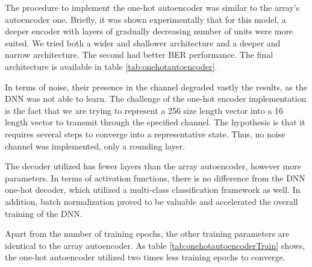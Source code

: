 \documentclass[conference]{IEEEtran}
\begin{document}
The procedure to implement the one-hot autoencoder was similar to the array's autoencoder one. Briefly, it was shown experimentally that for this model, a deeper encoder with layers of gradually decreasing number of units were more suited. We tried both a wider and shallower architecture and a deeper and narrow architecture. The second had better BER performance. The final architecture is available in table \ref{tab:onehotautoencoder}.

In terms of noise, their presence in the channel degraded vastly the results, as the DNN was not able to learn. The challenge of the one-hot encoder implementation is the fact that we are trying to represent a 256 size length vector into a 16 length vector to transmit through the specified channel. The hypothesis is that it requires several steps to converge into a representative state. Thus, no noise channel was implemented, only a rounding layer.

The decoder utilized has fewer layers than the array autoencoder, however more parameters. In terms of activation functions, there is no difference from the DNN one-hot decoder, which utilized a multi-class classification framework as well. In addition, batch normalization proved to be valuable and accelerated the overall training of the DNN.

Apart from the number of training epochs, the other training parameters are identical to the array autoencoder. As table \ref{tab:onehotautoencoderTrain} shows, the one-hot autoencoder utilized two times less training epochs to converge.
\end{document}
